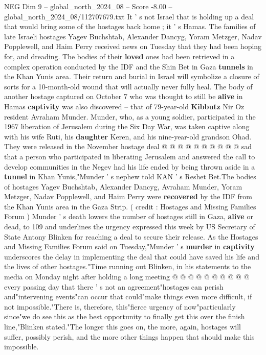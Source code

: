 \begin{textsample}{NEG Dim 9 – global\_north\_2024\_08 – Score -8.00 – global\_north\_2024\_08/112707679.txt}  \label{ex:f9_neg_084}
It ' s not Israel that is holding up a deal that would bring some of the hostages back home ; it ' s Hamas.
The families of late Israeli hostages Yagev Buchshtab, Alexander Dancyg, Yoram Metzger, Nadav Popplewell, and Haim Perry received news on Tuesday that they had been hoping for, and dreading.
The bodies of their \textbf{loved} ones had been retrieved in a complex operation conducted by the IDF and the Shin Bet in Gaza \textbf{tunnels} in the Khan Yunis area.
Their return and burial in Israel will symbolize a closure of sorts for a 10-month-old wound that will actually never fully heal.
The body of another hostage captured on October 7 who was thought to still be \textbf{alive} in Hamas \textbf{captivity} was also discovered -- that of 79-year-old \textbf{Kibbutz} Nir Oz resident Avraham Munder.
Munder, who, as a young soldier, participated in the 1967 liberation of Jerusalem during the Six Day War, was taken captive along with his wife Ruti, his \textbf{daughter} Keren, and his nine-year-old grandson Ohad.
They were released in the November hostage deal @ @ @ @ @ @ @ @ @ @ sad that a person who participated in liberating Jerusalem and answered the call to develop communities in the Negev had his life ended by being thrown aside in a \textbf{tunnel} in Khan Yunis,"Munder ' s nephew told KAN ' s Reshet Bet.The bodies of hostages Yagev Buchshtab, Alexander Dancyg, Avraham Munder, Yoram Metzger, Nadav Popplewell, and Haim Perry were \textbf{recovered} by the IDF from the Khan Yunis area in the Gaza Strip. ( credit : Hostages and Missing Families Forum ) Munder ' s death lowers the number of hostages still in Gaza, \textbf{alive} or dead, to 109 and underlines the urgency expressed this week by US Secretary of State Antony Blinken for reaching a deal to secure their release.
As the Hostages and Missing Families Forum said on Tuesday,"Munder ' s \textbf{murder} in \textbf{captivity} underscores the delay in implementing the deal that could have saved his life and the lives of other hostages."Time running out Blinken, in his statements to the media on Monday night after holding a long meeting @ @ @ @ @ @ @ @ @ @ every passing day that there ' s not an agreement"hostages can perish and"intervening events"can occur that could"make things even more difficult, if not impossible."There is, therefore, this"fierce urgency of now"particularly since"we do see this as the best opportunity to finally get this over the finish line,"Blinken stated."The longer this goes on, the more, again, hostages will suffer, possibly perish, and the more other things happen that should make this impossible.

\end{textsample}
